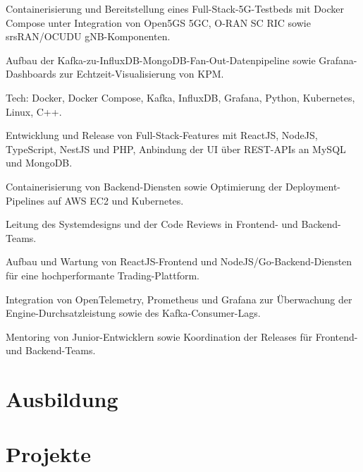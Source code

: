 \documentclass[10pt,a4paper]{resume}
\begin{document}
\bullets
  \item Containerisierung und Bereitstellung eines Full-Stack-5G-Testbeds mit Docker Compose unter Integration von Open5GS 5GC, O-RAN SC RIC sowie srsRAN/OCUDU gNB-Komponenten.
  \item Aufbau der Kafka-zu-InfluxDB-MongoDB-Fan-Out-Datenpipeline sowie Grafana-Dashboards zur Echtzeit-Visualisierung von KPM.
  \item Tech: Docker, Docker Compose, Kafka, InfluxDB, Grafana, Python, Kubernetes, Linux, C++.
\bulletsend
\vspace{1.5pt}
\bullets
  \item Entwicklung und Release von Full-Stack-Features mit ReactJS, NodeJS, TypeScript, NestJS und PHP, Anbindung der UI über REST-APIs an MySQL und MongoDB.
  \item Containerisierung von Backend-Diensten sowie Optimierung der Deployment-Pipelines auf AWS EC2 und Kubernetes.
  \item Leitung des Systemdesigns und der Code Reviews in Frontend- und Backend-Teams.
\bulletsend
\vspace{1.5pt}
\bullets
  \item Aufbau und Wartung von ReactJS-Frontend und NodeJS/Go-Backend-Diensten für eine hochperformante Trading-Plattform.
  \item Integration von OpenTelemetry, Prometheus und Grafana zur Überwachung der Engine-Durchsatzleistung sowie des Kafka-Consumer-Lags.
  \item Mentoring von Junior-Entwicklern sowie Koordination der Releases für Frontend- und Backend-Teams.
\bulletsend
\vspace{1.5pt}

\section{Ausbildung}

\vspace{2pt}

\section{Projekte}
\end{document}
